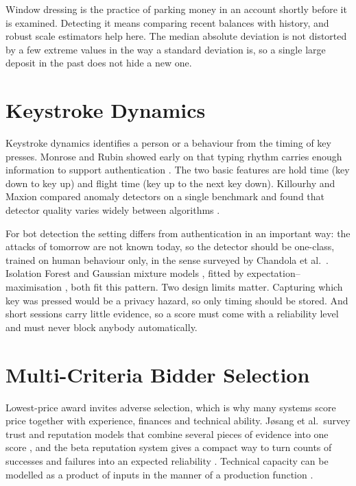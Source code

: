 Window dressing is the practice of parking money in an account shortly before it is examined. Detecting it means comparing recent balances with history, and robust scale estimators help here. The median absolute deviation \cite{rousseeuw1993alternatives} is not distorted by a few extreme values in the way a standard deviation is, so a single large deposit in the past does not hide a new one.

\section{Keystroke Dynamics}
Keystroke dynamics identifies a person or a behaviour from the timing of key presses. Monrose and Rubin showed early on that typing rhythm carries enough information to support authentication \cite{monrose2000keystroke}. The two basic features are hold time (key down to key up) and flight time (key up to the next key down). Killourhy and Maxion compared anomaly detectors on a single benchmark and found that detector quality varies widely between algorithms \cite{killourhy2009comparing}.

For bot detection the setting differs from authentication in an important way: the attacks of tomorrow are not known today, so the detector should be one-class, trained on human behaviour only, in the sense surveyed by Chandola et al.\ \cite{chandola2009anomaly}. Isolation Forest \cite{liu2008isolation} and Gaussian mixture models \cite{bishop2006prml}, fitted by expectation--maximisation \cite{dempster1977maximum}, both fit this pattern. Two design limits matter. Capturing which key was pressed would be a privacy hazard, so only timing should be stored. And short sessions carry little evidence, so a score must come with a reliability level and must never block anybody automatically.

\section{Multi-Criteria Bidder Selection}
Lowest-price award invites adverse selection, which is why many systems score price together with experience, finances and technical ability. J{\o}sang et al.\ survey trust and reputation models that combine several pieces of evidence into one score \cite{josang2007survey}, and the beta reputation system gives a compact way to turn counts of successes and failures into an expected reliability \cite{josang2002beta}. Technical capacity can be modelled as a product of inputs in the manner of a production function \cite{cobb1928theory}.

